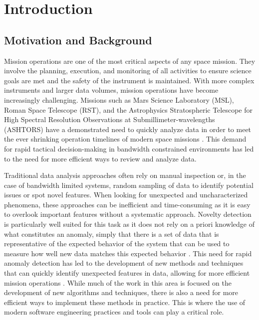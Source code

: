 \chapter{Introduction}
\label{chap:introduction}
\section{Motivation and Background}
Mission operations are one of the most critical aspects of any space mission.
They involve the planning, execution, and monitoring of all activities to ensure science goals are met and the safety of the instrument is maintained.
With more complex instruments and larger data volumes, mission operations have become increasingly challenging.
Missions such as Mars Science Laboratory (MSL), Roman Space Telescope (RST), and the Astrophysics Stratospheric Telescope for High Spectral Resolution Observations at Submillimeter-wavelengths (ASHTORS) have a demonstrated need to quickly analyze data in order to meet the ever shrinking operation timelines of modern space missions \parencite{wilson2017nasa}.
This demand for rapid tactical decision-making in bandwidth constrained environments has led to the need for more efficient ways to review and analyze data.

Traditional data analysis approaches often rely on manual inspection or, in the case of bandwidth limited systems, random sampling of data to identify potential issues or spot novel features.
When looking for unexpected and uncharacterized phenomena, these approaches can be inefficient and time-consuming as it is easy to overlook important features without a systematic approach.
Novelty detection is particularly well suited for this task as it does not rely on a priori knowledge of what constitutes an anomaly, simply that there is a set of data that is representative of the expected behavior of the system that can be used to measure how well new data matches this expected behavior \parencite{japkowicz1995novelty}.
This need for rapid anomaly detection has led to the development of new methods and techniques that can quickly identify unexpected features in data, allowing for more efficient mission operations \parencite{kerner2020comparison}.
While much of the work in this area is focused on the development of new algorithms and techniques, there is also a need for more efficient ways to implement these methods in practice.
This is where the use of modern software engineering practices and tools can play a critical role.

